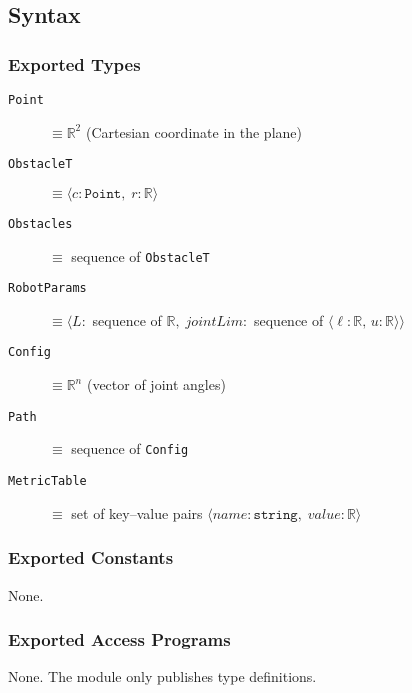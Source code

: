 \documentclass[12pt, titlepage]{article}
\begin{document}
\subsection{Syntax}
\subsubsection{Exported Types}
\begin{description}
  \item[\texttt{Point}] $\equiv \mathbb{R}^2$
        \hfill (Cartesian coordinate in the plane)
  \item[\texttt{ObstacleT}]
        $\equiv \langle c : \texttt{Point},\; r : \mathbb{R} \rangle$
  \item[\texttt{Obstacles}]
        $\equiv$ sequence of \texttt{ObstacleT}

  \item[\texttt{RobotParams}]
        $\equiv \langle
          L :$ sequence of $\mathbb{R},\;
          \textit{jointLim} :$ sequence of
          $\langle \ell : \mathbb{R},\, u : \mathbb{R}\rangle
        \rangle$

  \item[\texttt{Config}] $\equiv \mathbb{R}^n$
        \hfill (vector of joint angles)
  \item[\texttt{Path}] $\equiv$ sequence of \texttt{Config}

  \item[\texttt{MetricTable}]
        $\equiv$ set of key–value pairs
        $\langle \textit{name} : \texttt{string},\;
                 \textit{value} : \mathbb{R} \rangle$
\end{description}

\subsubsection{Exported Constants}
None.

\subsubsection{Exported Access Programs}
None.  The module only publishes type definitions.
\end{document}
